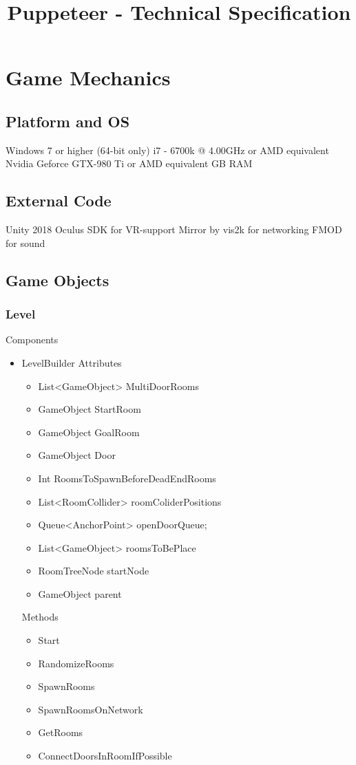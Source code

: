 \documentclass[11pt]{article}
\title{Puppeteer - Technical Specification}
\begin{document}
\maketitle


\newpage
\section{Game Mechanics}
\subsection{Platform and OS}
Windows 7 or higher (64-bit only)
\newline i7 - 6700k @ 4.00GHz or AMD equivalent
\newline Nvidia Geforce GTX-980 Ti or AMD equivalent
 GB RAM

\subsection{External Code}
Unity 2018
\newline Oculus SDK for VR-support
\newline Mirror by vis2k for networking
\newline FMOD for sound

\subsection{Game Objects}
\subsubsection{Level}
Components
\begin{itemize}
	\item LevelBuilder
	\newline Attributes
	\begin{itemize}
		\item List<GameObject> MultiDoorRooms
		\item GameObject StartRoom
		\item GameObject GoalRoom
		\item GameObject Door
		\item Int RoomsToSpawnBeforeDeadEndRooms
		\item List<RoomCollider> roomColiderPositions
		\item Queue<AnchorPoint> openDoorQueue;
		\item List<GameObject> roomsToBePlace
		\item RoomTreeNode startNode
		\item GameObject parent
	\end{itemize}
	Methods
	\begin{itemize}
		\item Start
		\item RandomizeRooms
		\item SpawnRooms
		\item SpawnRoomsOnNetwork
		\item GetRooms
		\item ConnectDoorsInRoomIfPossible
	\end{itemize}
\end{itemize}
\end{document}

